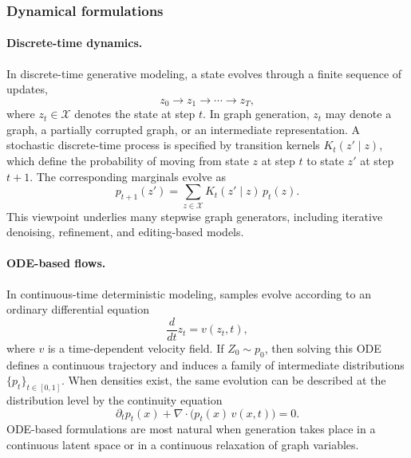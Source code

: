 \documentclass{article}
\begin{document}
\subsubsection{Dynamical formulations}

\paragraph{Discrete-time dynamics.}
In discrete-time generative modeling, a state evolves through a finite sequence of updates,
\begin{equation}
z_0 \to z_1 \to \cdots \to z_T,
\end{equation}
where $z_t \in \mathcal{X}$ denotes the state at step $t$. In graph generation, $z_t$ may denote a graph, a partially corrupted graph, or an intermediate representation. A stochastic discrete-time process is specified by transition kernels $K_t(z' \mid z)$, which define the probability of moving from state $z$ at step $t$ to state $z'$ at step $t+1$. The corresponding marginals evolve as
\begin{equation}
p_{t+1}(z') = \sum_{z \in \mathcal{X}} K_t(z' \mid z)\, p_t(z).
\label{eq:prelim_discrete_kernel}
\end{equation}
This viewpoint underlies many stepwise graph generators, including iterative denoising, refinement, and editing-based models.

\paragraph{ODE-based flows.}
In continuous-time deterministic modeling, samples evolve according to an ordinary differential equation
\begin{equation}
\frac{d}{dt} z_t = v(z_t,t),
\label{eq:prelim_ode}
\end{equation}
where $v$ is a time-dependent velocity field. If $Z_0 \sim p_0$, then solving this ODE defines a continuous trajectory and induces a family of intermediate distributions $\{p_t\}_{t\in[0,1]}$. When densities exist, the same evolution can be described at the distribution level by the continuity equation
\begin{equation}
\partial_t p_t(x) + \nabla \cdot \bigl(p_t(x)\, v(x,t)\bigr)=0.
\label{eq:prelim_continuity}
\end{equation}
ODE-based formulations are most natural when generation takes place in a continuous latent space or in a continuous relaxation of graph variables.
\end{document}
